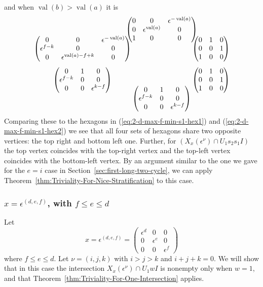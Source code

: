 \documentclass{amsart}
\theoremstyle{definition}
\def\e{\epsilon}
\def\val{\mathop{\mathrm{val}}}
\def\en{\e^{\nu}}
\def\X{X_x(\en)}
\def\heximages#1#2#3#4#5#6{
  \heximagessqueezedcarefully{1.7em}{-1em}{#1}{#2}{#3}{#4}{#5}{#6}
}
\def\heximagessqueezedcarefully#1#2#3#4#5#6#7#8{
  \begin{array}{ccc}
    & #3 & \\[#2]
    #5 \hspace{-#1} & & \hspace{-#1} #4 \\[2em]
    #6 \hspace{-#1} & & \hspace{-#1} #7 \\[#2]
    & #8 &
  \end{array}
}
\begin{document}
  and when $\val(b) > \val(a)$ it is
  \begin{equation*}
    \heximages
    	{\begin{pmatrix}
	    0 & 0 & \e^{-\val(a)} \\
	    0 & \e^{\val(a)} & 0 \\
	    1 & 0 & 0 
	\end{pmatrix}}
	{\begin{pmatrix}
	    0 & 1 & 0 \\
	    0 & 0 & 1  \\
	    1 & 0 & 0
	\end{pmatrix}}
	{\begin{pmatrix}
	    0 & 0 & \e^{-\val(a)} \\
	    \e^{f - k}  & 0 & 0 \\
	    0 & \e^{\val(a) - f + k}  & 0
	\end{pmatrix}}
	{\begin{pmatrix}
	    0 & 1 & 0 \\
	    \e^{f-k} & 0 & 0 \\
	    0 & 0 & \e^{k-f} 
	\end{pmatrix}}
	{\begin{pmatrix}
	    0 & 1 & 0 \\
	    0 & 0 & 1  \\
	    1 & 0 & 0
	\end{pmatrix}}
	{\begin{pmatrix}
	    0 & 1 & 0 \\
	    \e^{f-k} & 0 & 0 \\
	    0 & 0 & \e^{k-f} 
	\end{pmatrix}}
  \end{equation*}
  Comparing these to the hexagons in (\ref{eq:2-d-max-f-min-s1-hex1}) and
  (\ref{eq:2-d-max-f-min-s1-hex2}) we see that all four sets of hexagons share
  two opposite vertices: the top right and bottom left one.  Further, for $(\X
  \cap U_1 s_2s_1 I)$ the top vertex coincides with the top-right vertex and
  the top-left vertex coincides with the bottom-left vertex.  By an argument
  similar to the one we gave for the $e = i$ case in
  Section~\ref{sec:first-long-two-cycle}, we can apply
  Theorem~\ref{thm:Triviality-For-Nice-Stratification} to this case.  

  \subsubsection{$x = \e^{(d, e, f)}$, with $f \le e \le d$}
  Let
  \begin{equation}
    x = \e^{(d, e, f)} = \begin{pmatrix}
        \e^d  & 0 & 0\\
        0 & \e^e & 0 \\
        0 & 0 & \e^f
      \end{pmatrix}
  \end{equation}
  where $f \le e \le d$.  Let $\nu = (i,j,k)$ with $i > j > k$ and $i + j + k =
  0$.  We will show that in this case the intersection $\X \cap U_1 wI$ is
  nonempty only when $w = 1$, and that
  Theorem~\ref{thm:Triviality-For-One-Intersection} applies.
\end{document}
